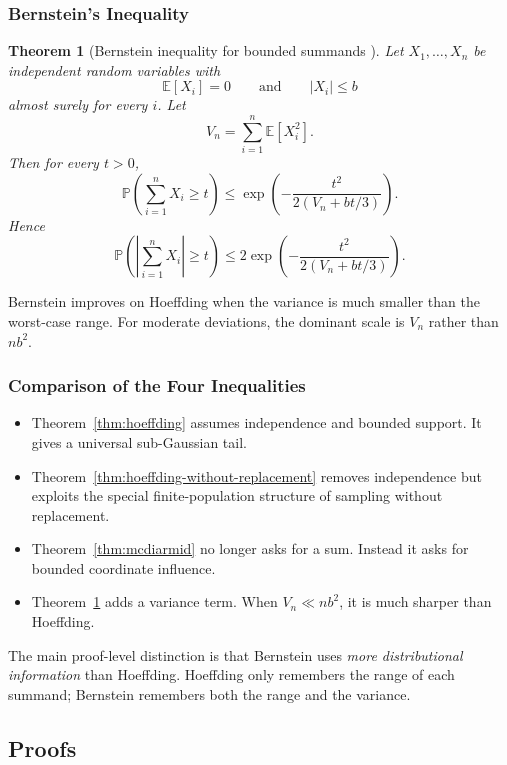 \documentclass{article}
\newtheorem{theorem}{Theorem}[section]
\theoremstyle{definition}
\theoremstyle{remark}
\newcommand{\EE}{\mathbb{E}}
\newcommand{\PP}{\mathbb{P}}
\begin{document}
\subsubsection{Bernstein's Inequality}

\begin{theorem}[Bernstein inequality for bounded summands \cite{Bennett1962}]
\label{thm:bernstein}
Let $X_1,\dots,X_n$ be independent random variables with
$$
\EE[X_i]=0
\qquad \text{and} \qquad
|X_i| \le b
$$
almost surely for every $i$. Let
$$
V_n = \sum_{i=1}^n \EE[X_i^2].
$$
Then for every $t>0$,
$$
\PP\!\left(
\sum_{i=1}^n X_i \ge t
\right)
\le
\exp\!\left(
-\frac{t^2}{2(V_n + bt/3)}
\right).
$$
Hence
$$
\PP\!\left(
\left|
\sum_{i=1}^n X_i
\right| \ge t
\right)
\le
2\exp\!\left(
-\frac{t^2}{2(V_n + bt/3)}
\right).
$$
\end{theorem}

Bernstein improves on Hoeffding when the variance is much smaller than the worst-case range. For moderate deviations, the dominant scale is $V_n$ rather than $nb^2$.

\subsubsection{Comparison of the Four Inequalities}

\begin{itemize}
\item Theorem~\ref{thm:hoeffding} assumes independence and bounded support. It gives a universal sub-Gaussian tail.
\item Theorem~\ref{thm:hoeffding-without-replacement} removes independence but exploits the special finite-population structure of sampling without replacement.
\item Theorem~\ref{thm:mcdiarmid} no longer asks for a sum. Instead it asks for bounded coordinate influence.
\item Theorem~\ref{thm:bernstein} adds a variance term. When $V_n \ll nb^2$, it is much sharper than Hoeffding.
\end{itemize}

The main proof-level distinction is that Bernstein uses \emph{more distributional information} than Hoeffding. Hoeffding only remembers the range of each summand; Bernstein remembers both the range and the variance.

\subsection{Proofs}
\end{document}
